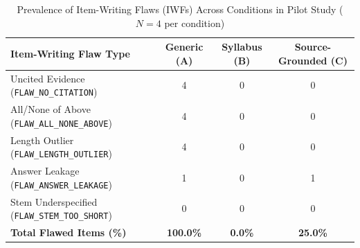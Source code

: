 \begin{table}[ht]
\centering
\caption{Prevalence of Item-Writing Flaws (IWFs) Across Conditions in Pilot Study ($N=4$ per condition)}
\label{tab:flaw_breakdown}
\begin{tabular}{lccc}
\hline
\textbf{Item-Writing Flaw Type} & \textbf{Generic (A)} & \textbf{Syllabus (B)} & \textbf{Source-Grounded (C)} \\
\hline
Uncited Evidence (\texttt{FLAW\_NO\_CITATION}) & 4 & 0 & 0 \\
All/None of Above (\texttt{FLAW\_ALL\_NONE\_ABOVE}) & 4 & 0 & 0 \\
Length Outlier (\texttt{FLAW\_LENGTH\_OUTLIER}) & 4 & 0 & 0 \\
Answer Leakage (\texttt{FLAW\_ANSWER\_LEAKAGE}) & 1 & 0 & 1 \\
Stem Underspecified (\texttt{FLAW\_STEM\_TOO\_SHORT}) & 0 & 0 & 0 \\
\hline
\textbf{Total Flawed Items (\%)} & \textbf{100.0\%} & \textbf{0.0\%} & \textbf{25.0\%} \\
\hline
\end{tabular}
\end{table}
